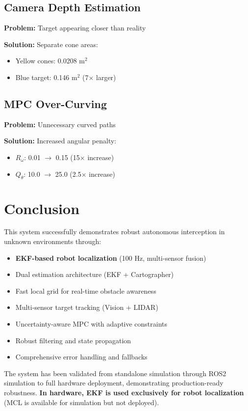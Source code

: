 \documentclass[11pt]{article}
\begin{document}
\subsection{Camera Depth Estimation}

\textbf{Problem:} Target appearing closer than reality

\textbf{Solution:} Separate cone areas:
\begin{itemize}
    \item Yellow cones: 0.0208 m$^2$
    \item Blue target: 0.146 m$^2$ (7$\times$ larger)
\end{itemize}

\subsection{MPC Over-Curving}

\textbf{Problem:} Unnecessary curved paths

\textbf{Solution:} Increased angular penalty:
\begin{itemize}
    \item $R_\omega$: 0.01 $\rightarrow$ 0.15 (15$\times$ increase)
    \item $Q_\theta$: 10.0 $\rightarrow$ 25.0 (2.5$\times$ increase)
\end{itemize}

\section{Conclusion}

This system successfully demonstrates robust autonomous interception in unknown environments through:
\begin{itemize}
    \item \textbf{EKF-based robot localization} (100 Hz, multi-sensor fusion)
    \item Dual estimation architecture (EKF + Cartographer)
    \item Fast local grid for real-time obstacle awareness
    \item Multi-sensor target tracking (Vision + LIDAR)
    \item Uncertainty-aware MPC with adaptive constraints
    \item Robust filtering and state propagation
    \item Comprehensive error handling and fallbacks
\end{itemize}

The system has been validated from standalone simulation through ROS2 simulation to full hardware deployment, demonstrating production-ready robustness. \textbf{In hardware, EKF is used exclusively for robot localization} (MCL is available for simulation but not deployed).
\end{document}
